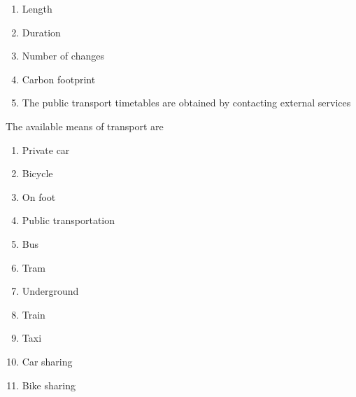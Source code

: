 \begin{itemize}
\begin{enumerate}
		\item Length
		\item Duration
		\item Number of changes
		\item Carbon footprint
		\item The public transport timetables are obtained by contacting external services
	\end{enumerate}
	\subsubitem[R2.4.4]The available means of transport are
	\begin{enumerate}

		\item Private car
		\item Bicycle
		\item On foot
		\item Public transportation
		\item Bus
		\item Tram
		\item Underground
		\item Train
		\item Taxi
		\item Car sharing
		\item Bike sharing
	\end{enumerate}
	

\end{itemize}
